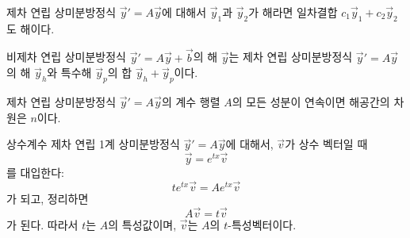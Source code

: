 \documentclass[../engineering_mathematics_lecture_note.tex]{subfiles}
\begin{document}
\begin{theorem}
    제차 연립 상미분방정식 $\vec y' = A \vec y$에 대해서 $\vec y_1$과 $\vec y_2$가 해라면 일차결합 $c_1 \vec y_1 + c_2 \vec y_2$도 해이다.
\end{theorem}

\begin{theorem}
    비제차 연립 상미분방정식 $\vec y' = A \vec y + \vec b$의 해 $\vec y$는 제차 연립 상미분방정식 $\vec y' = A \vec y$의 해 $\vec y_h$와 특수해 $\vec y_p$의 합 $\vec y_h + \vec y_p$이다.
\end{theorem}

\begin{theorem}
    제차 연립 상미분방정식 $\vec y' = A \vec y$의 계수 행렬 $A$의 모든 성분이 연속이면 해공간의 차원은 $n$이다.
\end{theorem}

\begin{example}
    상수계수 제차 연립 1계 상미분방정식 $\vec y' = A \vec y$에 대해서, $\vec v$가 상수 벡터일 때
    \begin{equation*}
        \vec y = e^{tx} \vec v
    \end{equation*}
    를 대입한다:
    \begin{equation*}
        t e^{tx} \vec v = A e^{tx} \vec v
    \end{equation*}
    가 되고, 정리하면
    \begin{equation*}
        A \vec v = t \vec v
    \end{equation*}
    가 된다.
    따라서 $t$는 $A$의 특성값이며, $\vec v$는 $A$의 $t$-특성벡터이다.
\end{example}
\end{document}
